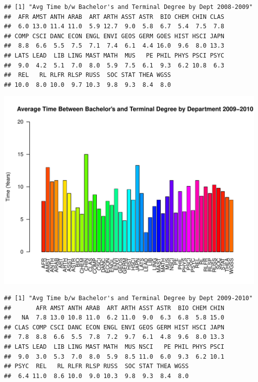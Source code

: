 \documentclass[12pt,a4paper]{article}\usepackage[]{graphicx}\usepackage[]{color}
\makeatletter
\def\maxwidth{ %
  \ifdim\Gin@nat@width>\linewidth
    \linewidth
  \else
    \Gin@nat@width
  \fi
}
\newenvironment{kframe}{%
 \def\at@end@of@kframe{}%
 \ifinner\ifhmode%
  \def\at@end@of@kframe{\end{minipage}}%
  \begin{minipage}{\columnwidth}%
 \fi\fi%
 \def\FrameCommand##1{\hskip\@totalleftmargin \hskip-\fboxsep
 \colorbox{shadecolor}{##1}\hskip-\fboxsep
     \hskip-\linewidth \hskip-\@totalleftmargin \hskip\columnwidth}%
 \MakeFramed {\advance\hsize-\width
   \@totalleftmargin\z@ \linewidth\hsize
   \@setminipage}}%
 {\par\unskip\endMakeFramed%
 \at@end@of@kframe}
\newenvironment{knitrout}{}{} %
\theoremstyle{definition}
\makeatother
\begin{document}
\begin{knitrout}
\begin{kframe}\begin{verbatim}
## [1] "Avg Time b/w Bachelor's and Terminal Degree by Dept 2008-2009"
##  AFR AMST ANTH ARAB  ART ARTH ASST ASTR  BIO CHEM CHIN CLAS 
##  6.0 13.0 11.4 11.0  5.9 12.7  9.0  5.8  6.7  5.4  7.5  7.8 
## COMP CSCI DANC ECON ENGL ENVI GEOS GERM GOES HIST HSCI JAPN 
##  8.8  6.6  5.5  7.5  7.1  7.4  6.1  4.4 16.0  9.6  8.0 13.3 
## LATS LEAD  LIB LING MAST MATH  MUS   PE PHIL PHYS PSCI PSYC 
##  9.0  4.2  5.1  7.0  8.0  5.9  7.5  6.1  9.3  6.2 10.8  6.3 
##  REL   RL RLFR RLSP RUSS  SOC STAT THEA WGSS 
## 10.0  8.0 10.0  9.7 10.3  9.8  9.3  8.4  8.0
\end{verbatim}
\end{kframe}
\includegraphics[width=\maxwidth]{figure/unnamed-chunk-13-6} 
\begin{kframe}\begin{verbatim}
## [1] "Avg Time b/w Bachelor's and Terminal Degree by Dept 2009-2010"
##       AFR AMST ANTH ARAB  ART ARTH ASST ASTR  BIO CHEM CHIN 
##   NA  7.8 13.0 10.8 11.0  6.2 11.0  9.0  6.3  6.8  5.8 15.0 
## CLAS COMP CSCI DANC ECON ENGL ENVI GEOS GERM HIST HSCI JAPN 
##  7.8  8.8  6.6  5.5  7.8  7.2  9.7  6.1  4.8  9.6  8.0 13.3 
## LATS LEAD  LIB LING MAST MATH  MUS NSCI   PE PHIL PHYS PSCI 
##  9.0  3.0  5.3  7.0  8.0  5.9  8.5 11.0  6.0  9.3  6.2 10.1 
## PSYC  REL   RL RLFR RLSP RUSS  SOC STAT THEA WGSS 
##  6.4 11.0  8.6 10.0  9.0 10.3  9.8  9.3  8.4  8.0
\end{verbatim}
\end{kframe}

\end{knitrout}
\end{document}
